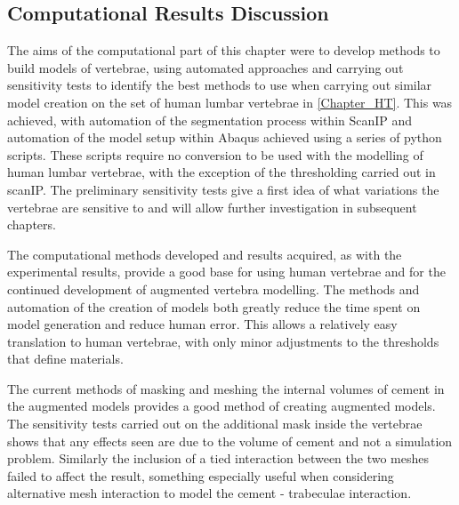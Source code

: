 \subsection{Computational Results Discussion}

The aims of the computational part of this chapter were to develop methods to
build models of vertebrae, using automated approaches and carrying out
sensitivity tests to identify the best methods to use when carrying out similar
model creation on the set of human lumbar vertebrae in \cref{Chapter_HT}. This
was achieved, with automation of the segmentation process within ScanIP and
automation of the model setup within Abaqus achieved using a series of python
scripts. These scripts require no conversion to be used with the modelling of
human lumbar vertebrae, with the exception of the thresholding carried out in
scanIP. The preliminary sensitivity tests give a first idea of what variations
the vertebrae are sensitive to and will allow further investigation in
subsequent chapters.


The computational methods developed and results acquired, as with the
experimental results, provide a good base for using human vertebrae and for the
continued development of augmented vertebra modelling. The methods and
automation of the creation of models both greatly reduce the time spent on
model generation and reduce human error. This allows a relatively easy
translation to human vertebrae, with only minor adjustments to the thresholds
that define materials.

The current methods of masking and meshing the internal volumes of cement in
the augmented models provides a good method of creating augmented models. The
sensitivity tests carried out on the additional mask inside the vertebrae shows
that any effects seen are due to the volume of cement and not a simulation
problem. Similarly the inclusion of a tied interaction between the two meshes
failed to affect the result, something especially useful when considering
alternative mesh interaction to model the cement - trabeculae interaction.

